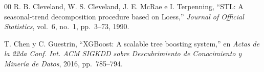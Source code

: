\documentclass[conference]{IEEEtran}
\begin{document}
\begin{thebibliography}{00}
R. B. Cleveland, W. S. Cleveland, J. E. McRae e I. Terpenning,
``STL: A seasonal-trend decomposition procedure based on Loess,''
\textit{Journal of Official Statistics}, vol.~6, no.~1, pp.~3--73, 1990.

T. Chen y C. Guestrin,
``XGBoost: A scalable tree boosting system,''
en \textit{Actas de la 22da Conf. Int. ACM SIGKDD sobre Descubrimiento de Conocimiento y Miner\'ia de Datos}, 2016, pp.~785--794.

\end{thebibliography}
\end{document}
